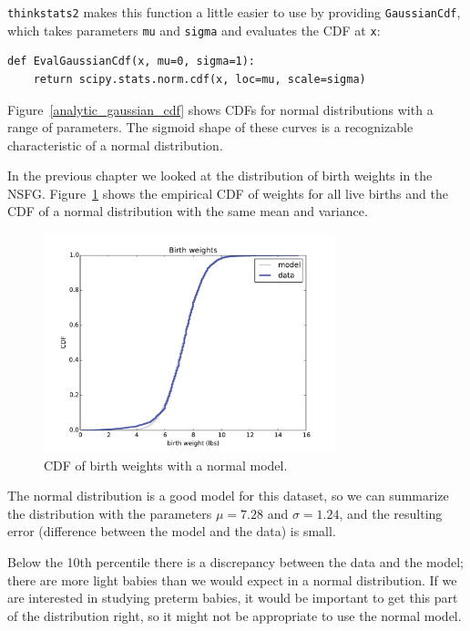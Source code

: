 \documentclass[12pt]{book}
\begin{document}
{\tt thinkstats2} makes this function a little easier to use
by providing {\tt GaussianCdf}, which takes parameters {\tt mu}
and {\tt sigma} and evaluates the CDF at {\tt x}:

\begin{verbatim}
def EvalGaussianCdf(x, mu=0, sigma=1):
    return scipy.stats.norm.cdf(x, loc=mu, scale=sigma)
\end{verbatim}

Figure~\ref{analytic_gaussian_cdf} shows CDFs for normal
distributions with a range of parameters.  The sigmoid shape of these
curves is a recognizable characteristic of a normal distribution.

In the previous chapter we looked at the distribution of birth
weights in the NSFG.  Figure~\ref{analytic_birthwgt_model} shows the
empirical CDF of weights for all live births and the CDF of
a normal distribution with the same mean and variance.

\begin{figure}
\centerline{\includegraphics[height=2.5in]{figs/analytic_birthwgt_model.pdf}}
\caption{CDF of birth weights with a normal model.}
\label{analytic_birthwgt_model}
\end{figure}

The normal distribution is a good model for this dataset, so
we can summarize the distribution with the parameters
$\mu = 7.28$ and $\sigma = 1.24$, and the resulting error
(difference between the model and the data) is small.

Below the 10th percentile there is a discrepancy between the data
and the model; there are more light babies than we would expect in
a normal distribution.  If we are interested in studying preterm
babies, it would be important to get this part of the distribution
right, so it might not be appropriate to use the normal
model.
\end{document}
